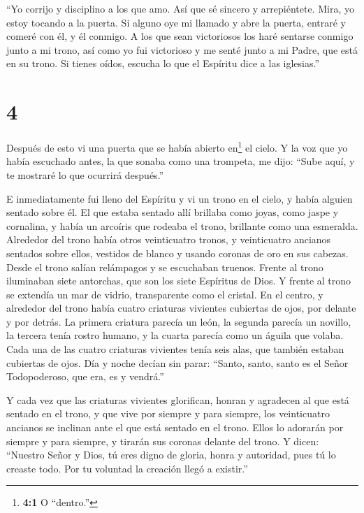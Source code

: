  ``Yo corrijo y disciplino a los que amo. Así que sé
sincero y arrepiéntete.  Mira, yo estoy tocando a la
puerta. Si alguno oye mi llamado y abre la puerta, entraré y comeré con
él, y él conmigo.  A los que sean victoriosos los haré
sentarse conmigo junto a mi trono, así como yo fui victorioso y me senté
junto a mi Padre, que está en su trono.  Si tienes oídos,
escucha lo que el Espíritu dice a las iglesias.''

\hypertarget{section-3}{%
\section{4}\label{section-3}}

 Después de esto vi una puerta que se había abierto
en\footnote{\textbf{4:1} O ``dentro.''} el cielo. Y la voz que yo había
escuchado antes, la que sonaba como una trompeta, me dijo: ``Sube aquí,
y te mostraré lo que ocurrirá después.''

 E inmediatamente fui lleno del Espíritu y vi un trono en el
cielo, y había alguien sentado sobre él.  El que estaba
sentado allí brillaba como joyas, como jaspe y cornalina, y había un
arcoíris que rodeaba el trono, brillante como una esmeralda.
 Alrededor del trono había otros veinticuatro tronos, y
veinticuatro ancianos sentados sobre ellos, vestidos de blanco y usando
coronas de oro en sus cabezas.  Desde el trono salían
relámpagos y se escuchaban truenos. Frente al trono iluminaban siete
antorchas, que son los siete Espíritus de Dios.  Y frente al
trono se extendía un mar de vidrio, transparente como el cristal. En el
centro, y alrededor del trono había cuatro criaturas vivientes cubiertas
de ojos, por delante y por detrás.  La primera criatura
parecía un león, la segunda parecía un novillo, la tercera tenía rostro
humano, y la cuarta parecía como un águila que volaba.  Cada
una de las cuatro criaturas vivientes tenía seis alas, que también
estaban cubiertas de ojos. Día y noche decían sin parar: ``Santo, santo,
santo es el Señor Todopoderoso, que era, es y vendrá.''

 Y cada vez que las criaturas vivientes glorifican, honran y
agradecen al que está sentado en el trono, y que vive por siempre y para
siempre,  los veinticuatro ancianos se inclinan ante el que
está sentado en el trono. Ellos lo adorarán por siempre y para siempre,
y tirarán sus coronas delante del trono. Y dicen: 
``Nuestro Señor y Dios, tú eres digno de gloria, honra y autoridad, pues
tú lo creaste todo. Por tu voluntad la creación llegó a existir.''

